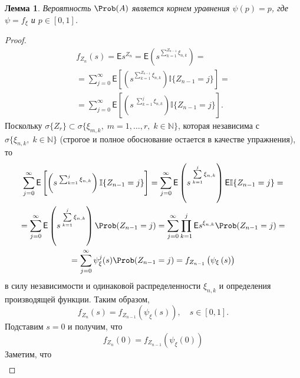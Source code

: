 \documentclass[a4paper]{article}
\newcommand{\Expect}{\mathsf{E}}
\theoremstyle{plain}
\newtheorem{lem}[thm]{Лемма}
\theoremstyle{definition}
\theoremstyle{remark}
\begin{document}
\begin{lem}
  \label{lem1}
  Вероятность $\Prob(A)$ является корнем уравнения $\psi(p) = p$, где $\psi = f_{\xi}$ и $p \in [0, 1]$.
\end{lem}

\begin{proof}

  \begin{multline*}
    f_{Z_{n}}(s) = \Expect s^{Z_{n}} = \Expect \left(s^{\sum_{k=1}^{Z_{n-1}} \xi_{n, k}}\right) =\\
    = \sum_{j=0}^{\infty} \Expect \left[ \left( s^{\sum_{k=1}^{Z_{n-1}} \xi_{n, k}} \right)  \mathbb{I} \lbrace Z_{n-1} = j \rbrace \right] = \\ = \sum_{j=0}^{\infty} \Expect \left[ \left( s \: ^{\sum_{k=1}^{j} \xi_{n, k}} \right)  \mathbb{I} \lbrace Z_{n-1} = j \rbrace \right].
  \end{multline*}
  Поскольку $\sigma \lbrace Z_{r} \rbrace \subset \sigma \lbrace \xi_{m, k}, \; m = 1, \ldots, r, \; k \in \mathbb{N} \rbrace$, которая независима с $\sigma \lbrace \xi_{n, k}, \; k \in \mathbb{N} \rbrace$ (строгое и полное обоснование остается в качестве упражнения), то
  \begin{multline*}
    \sum_{j=0}^{\infty} \Expect \left[ \left( s \: ^{\sum_{k=1}^{j} \xi_{n, k}} \right)  \mathbb{I} \lbrace Z_{n-1} = j \rbrace \right]  =  \sum\limits_{j=0}^{\infty} \Expect \left(s \: ^{\sum\limits_{k=1}^{j} \xi_{n, k}}\right) \Expect \mathbb{I} \lbrace Z_{n-1} = j \rbrace  = \\ = \sum\limits_{j=0}^{\infty} \Expect \left(s \: ^{\sum\limits_{k=1}^{j} \xi_{n, k}}\right) \Prob ( Z_{n-1} = j ) = \sum\limits_{j=0}^{\infty} \prod\limits_{k=1}^{j} \Expect s^{\xi_{n, k}} \Prob (Z_{n-1} = j) = \\ = \sum\limits_{j=0}^{\infty} \psi_{\xi}^{j} (s) \Prob (Z_{n-1} = j)  =  f_{Z_{n-1}} \left(\psi_{\xi} \left(s \right) \right)
  \end{multline*}
  в силу независимости и одинаковой распределенности $\xi_{n, k}$ и определения производящей функции. Таким образом,
  \begin{equation*}
    f_{Z_{n}} (s) = f_{Z_{n-1}} \left( \psi_{\xi} \left(s \right)\right){,}\quad s \in [0, 1]{.}
  \end{equation*}
  Подставим $s = 0$ и получим, что
  \begin{equation*}
    f_{Z_{n}} (0) = f_{Z_{n-1}} \left( \psi_{\xi} \left(0 \right)\right)
  \end{equation*}
  Заметим, что
  \begin{multline*}

\end{multline*}
\end{proof}
\end{document}
